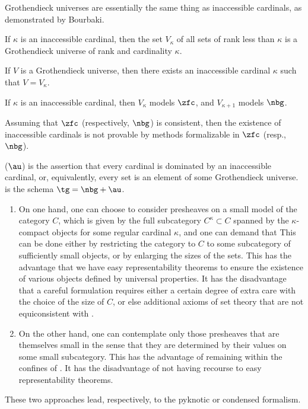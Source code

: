 Grothendieck universes are essentially the same thing as inaccessible cardinals, as demonstrated by Bourbaki.\cite[Exposé I, Appendix]{Anonymous:1972tk}
\begin{proposition}[Bourbaki]
	If $\kappa$ is an inaccessible cardinal, then the set $V_{\kappa}$ of all sets of rank less than $\kappa$ is a Grothendieck universe of rank and cardinality $\kappa$.

	If $ V $ is a Grothendieck universe, then there exists an inaccessible cardinal $ \kappa $ such that $ V=V_{\kappa} $.
\end{proposition}

\begin{theorem}
	If $ \kappa $ is an inaccessible cardinal, then $V_{\kappa} $ models $ \zfc $, and $ V_{\kappa+1} $ models $ \nbg $.
	
	Assuming that $ \zfc $ (respectively, $ \nbg $) is consistent, then the existence of inaccessible cardinals is not provable by methods formalizable in $ \zfc $ (resp., $ \nbg $).
\end{theorem}

\begin{axiom}%
\label{axm:AU}
	 ($ \au $) is the assertion that every cardinal is dominated by an inaccessible cardinal, or, equivalently, every set is an element of some Grothendieck universe.
	 is the schema $\tg = \nbg+\au$.
\end{axiom}



\begin{enumerate}
	\item On one hand, one can choose to consider presheaves on a small model of the category $C$,
		which is given by the full subcategory $ C^{\kappa} \subset C $ spanned by the $ \kappa $-compact objects for some regular cardinal $ \kappa $, and one can demand that 
		This can be done either by restricting the category to $C$ to some subcategory of sufficiently small objects,
		or by enlarging the sizes of the sets.
		This has the advantage that we have easy representability theorems to ensure the existence of various objects defined by universal properties.
		It has the disadvantage that a careful formulation requires either a certain degree of extra care with the choice of the size of $C$,
		or else additional axioms of set theory that are not equiconsistent with \zfc.
	\item On the other hand, one can contemplate only those presheaves that are themselves small in the sense that they are determined by their values on some small subcategory.
		This has the advantage of remaining within the confines of \zfc.
		It has the disadvantage of not having recourse to easy representability theorems.
\end{enumerate}
These two approaches lead, respectively, to the pyknotic or condensed formalism.

